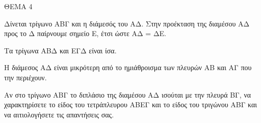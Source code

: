 
ΘΕΜΑ 4

Δίνεται τρίγωνο ΑΒΓ και η διάμεσός του ΑΔ. Στην προέκταση της διαμέσου ΑΔ προς το Δ παίρνουμε σημείο Ε, έτσι ώστε ΑΔ = ΔΕ.

\begin{alist}
\item Να αποδείξετε ότι :

.}
\end{alist}
\begin{alist}
\item
  Τα τρίγωνα ΑΒΔ και ΕΓΔ είναι ίσα. 
\item
  Η διάμεσος ΑΔ είναι μικρότερη από το ημιάθροισμα των πλευρών ΑΒ και ΑΓ που την περιέχουν. 

\item Αν στο τρίγωνο ΑΒΓ το διπλάσιο της διαμέσου ΑΔ ισούται με την πλευρά ΒΓ, να χαρακτηρίσετε το είδος του τετράπλευρου ΑΒΕΓ και το είδος του τριγώνου ΑΒΓ και να αιτιολογήσετε τις απαντήσεις σας.

\end{alist}
